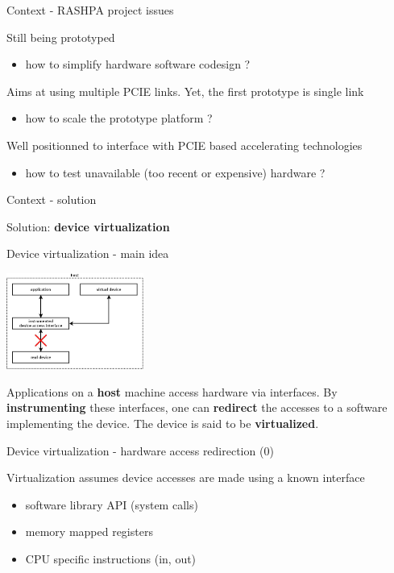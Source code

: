 \documentclass{beamer}
\begin{document}
\begin{frame}{Context - RASHPA project issues}
  \begin{small}
  Still being prototyped
  \begin{itemize}
  \item how to simplify hardware software codesign ?
  \end{itemize}

  Aims at using multiple PCIE links. Yet, the first prototype is single link
  \begin{itemize}
  \item how to scale the prototype platform ?
  \end{itemize}

  Well positionned to interface with PCIE based accelerating technologies
  \begin{itemize}
  \item how to test unavailable (too recent or expensive) hardware ?
  \end{itemize}
  \end{small}
\end{frame}

\begin{frame}{Context - solution}
  \begin{center} Solution: \textbf{device virtualization} \end{center}
\end{frame}

\begin{frame}{Device virtualization - main idea}
  \begin{center}
    \includegraphics[width=45mm]{pic/dv_redirect/main.jpeg}
  \end{center}
  \begin{small}
    Applications on a \textbf{host} machine access hardware via interfaces. By
    \textbf{instrumenting} these interfaces, one can \textbf{redirect} the accesses
    to a software implementing the device. The device is said to be
    \textbf{virtualized}.
  \end{small}
\end{frame}

\begin{frame}{Device virtualization - hardware access redirection (0)}
  \begin{small}
  Virtualization assumes device accesses are made using a known interface
  \begin{itemize}
  \item software library API (system calls)
  \item memory mapped registers
  \item CPU specific instructions (in, out)
  \end{itemize}
  \end{small}
\end{frame}
\end{document}
